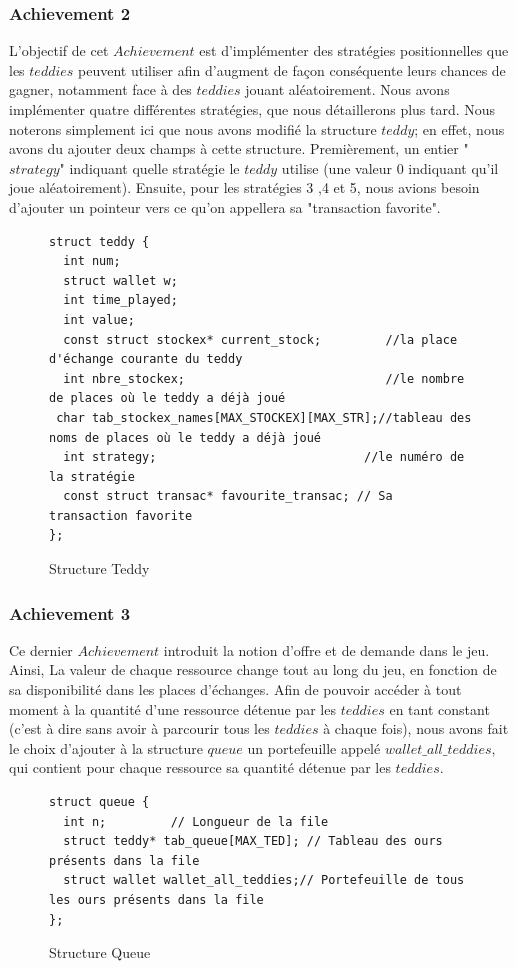 \documentclass{article}
\begin{document}
\subsubsection{Achievement 2}
L'objectif de cet $Achievement$ est d'implémenter des stratégies positionnelles que les $teddies$ peuvent utiliser afin d'augment de façon conséquente leurs chances de gagner, notamment face à des $teddies$ jouant aléatoirement. Nous avons implémenter quatre différentes stratégies, que nous détaillerons plus tard. Nous noterons simplement ici que nous avons modifié la structure $teddy$; en effet, nous avons du ajouter deux champs à cette structure. Premièrement, un entier "$strategy$" indiquant quelle stratégie le $teddy$ utilise (une valeur 0 indiquant qu'il joue aléatoirement). Ensuite, pour les stratégies 3 ,4 et 5, nous avions besoin d'ajouter un pointeur vers ce qu'on appellera sa "transaction favorite".
\begin{figure}[h]
    \centering
\begin{lstlisting}
struct teddy {
  int num;
  struct wallet w;
  int time_played;
  int value;
  const struct stockex* current_stock;         //la place d'échange courante du teddy
  int nbre_stockex;                            //le nombre de places où le teddy a déjà joué
 char tab_stockex_names[MAX_STOCKEX][MAX_STR];//tableau des noms de places où le teddy a déjà joué
  int strategy;                             //le numéro de la stratégie
  const struct transac* favourite_transac; // Sa transaction favorite
};
\end{lstlisting}
    \caption{Structure Teddy}
    \label{fig:teddy}
\end{figure}

\subsubsection{Achievement 3}
Ce dernier $Achievement$ introduit la notion d'offre et de demande dans le jeu. Ainsi, La valeur de chaque ressource change tout au long du jeu, en fonction de sa disponibilité dans les places d'échanges. Afin de pouvoir accéder à tout moment à la quantité d'une ressource détenue par les $teddies$ en tant constant (c'est à dire sans avoir à parcourir tous les $teddies$ à chaque fois), nous avons fait le choix d'ajouter à la structure $queue$ un portefeuille appelé $wallet\_all\_teddies$, qui contient pour chaque ressource sa quantité détenue par les $teddies$. 
\begin{figure}[h]
    \centering
\begin{lstlisting}
struct queue {
  int n;         // Longueur de la file
  struct teddy* tab_queue[MAX_TED]; // Tableau des ours présents dans la file
  struct wallet wallet_all_teddies;// Portefeuille de tous les ours présents dans la file
};
\end{lstlisting}
    \caption{Structure Queue}
    \label{fig:queue}
\end{figure}
\end{document}
